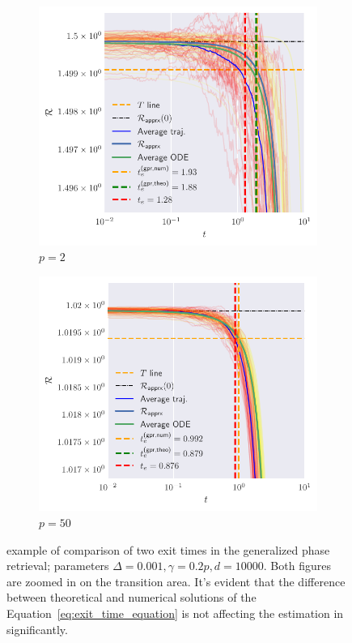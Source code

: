 \begin{figure}
  \centering
  \begin{subfigure}{0.75\textwidth}
    \includegraphics[width=1.\textwidth]{figures/spherical/gpr-p2.pdf}
    \caption{\(p=2\)}
  \end{subfigure}
  \begin{subfigure}{0.75\textwidth}
    \includegraphics[width=1.\textwidth]{figures/spherical/gpr-p50.pdf}
    \caption{\(p=50\)}
  \end{subfigure}

  \caption{
    example of comparison of two exit times in the generalized phase retrieval; parameters \(\Delta=\num{0.001}, \gamma=0.2p, d=\num{10000}\).
    Both figures are zoomed in on the transition area.
    It's evident that the difference between theoretical and numerical solutions of the Equation~\eqref{eq:exit_time_equation}
    is not affecting the estimation in significantly.
  }
  \label{fig:spherical-generalized-phase-retrivial}
\end{figure}



